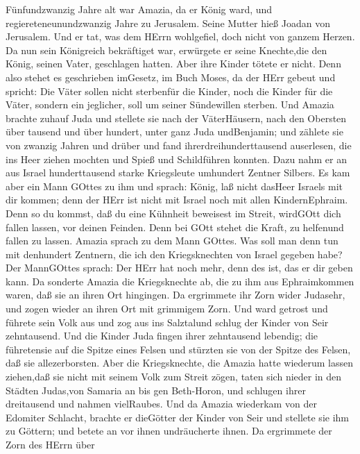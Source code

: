  Fünfundzwanzig Jahre alt war Amazia, da er König ward, und
regiereteneunundzwanzig Jahre zu Jerusalem. Seine Mutter hieß Joadan von
Jerusalem.  Und er tat, was dem HErrn wohlgefiel, doch nicht
von ganzem Herzen.  Da nun sein Königreich bekräftiget war,
erwürgete er seine Knechte,die den König, seinen Vater, geschlagen
hatten.  Aber ihre Kinder tötete er nicht. Denn also stehet
es geschrieben imGesetz, im Buch Moses, da der HErr gebeut und spricht:
Die Väter sollen nicht sterbenfür die Kinder, noch die Kinder für die
Väter, sondern ein jeglicher, soll um seiner Sündewillen sterben.
 Und Amazia brachte zuhauf Juda und stellete sie nach der
VäterHäusern, nach den Obersten über tausend und über hundert, unter
ganz Juda undBenjamin; und zählete sie von zwanzig Jahren und drüber und
fand ihrerdreihunderttausend auserlesen, die ins Heer ziehen mochten und
Spieß und Schildführen konnten.  Dazu nahm er an aus Israel
hunderttausend starke Kriegsleute umhundert Zentner Silbers.
 Es kam aber ein Mann GOttes zu ihm und sprach: König, laß
nicht dasHeer Israels mit dir kommen; denn der HErr ist nicht mit Israel
noch mit allen KindernEphraim.  Denn so du kommst, daß du
eine Kühnheit beweisest im Streit, wirdGOtt dich fallen lassen, vor
deinen Feinden. Denn bei GOtt stehet die Kraft, zu helfenund fallen zu
lassen.  Amazia sprach zu dem Mann GOttes. Was soll man denn
tun mit denhundert Zentnern, die ich den Kriegsknechten von Israel
gegeben habe? Der MannGOttes sprach: Der HErr hat noch mehr, denn des
ist, das er dir geben kann.  Da sonderte Amazia die
Kriegsknechte ab, die zu ihm aus Ephraimkommen waren, daß sie an ihren
Ort hingingen. Da ergrimmete ihr Zorn wider Judasehr, und zogen wieder
an ihren Ort mit grimmigem Zorn.  Und ward getrost und
führete sein Volk aus und zog aus ins Salztalund schlug der Kinder von
Seir zehntausend.  Und die Kinder Juda fingen ihrer
zehntausend lebendig; die führetensie auf die Spitze eines Felsen und
stürzten sie von der Spitze des Felsen, daß sie allezerborsten.
 Aber die Kriegsknechte, die Amazia hatte wiederum lassen
ziehen,daß sie nicht mit seinem Volk zum Streit zögen, taten sich nieder
in den Städten Judas,von Samaria an bis gen Beth-Horon, und schlugen
ihrer dreitausend und nahmen vielRaubes.  Und da Amazia
wiederkam von der Edomiter Schlacht, brachte er dieGötter der Kinder von
Seir und stellete sie ihm zu Göttern; und betete an vor ihnen
undräucherte ihnen.  Da ergrimmete der Zorn des HErrn über

